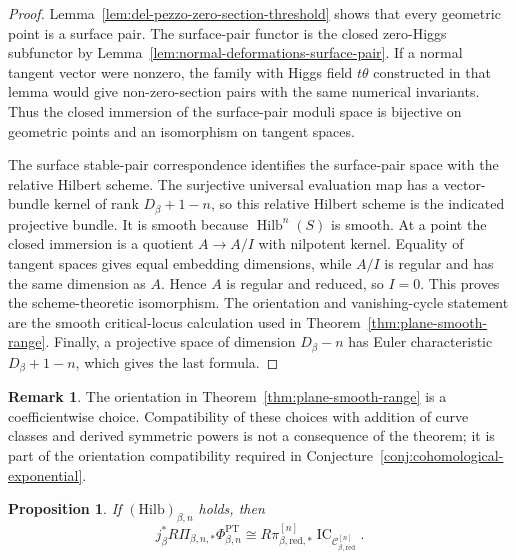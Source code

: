 \documentclass[11pt,reqno]{amsart}
\newtheorem{proposition}[theorem]{Proposition}
\theoremstyle{definition}
\newtheorem{remark}[theorem]{Remark}
\newcommand{\IC}{\operatorname{IC}}
\newcommand{\Hilb}{\operatorname{Hilb}}
\newcommand{\PT}{\operatorname{PT}}
\newcommand{\red}{\mathrm{red}}
\begin{document}
\begin{proof}
Lemma~\ref{lem:del-pezzo-zero-section-threshold} shows that every geometric
point is a surface pair.  The surface-pair functor is the closed zero-Higgs
subfunctor by Lemma~\ref{lem:normal-deformations-surface-pair}.  If a
normal tangent vector were nonzero, the family with Higgs field
\(t\theta\) constructed in that lemma would give non-zero-section pairs
with the same numerical invariants.  Thus the closed immersion of the
surface-pair moduli space is bijective on geometric points and an
isomorphism on tangent spaces.

The surface stable-pair correspondence
\cite[Proposition~1]{CKK} identifies the surface-pair space with the
relative Hilbert scheme.  The surjective universal evaluation map has a
vector-bundle kernel of rank \(D_\beta+1-n\), so this relative Hilbert
scheme is the indicated projective bundle.  It is smooth because \(\Hilb^n(S)\) is
smooth.  At a point the closed immersion is a
quotient \(A\to A/I\) with nilpotent kernel.  Equality of tangent spaces
gives equal embedding dimensions, while \(A/I\) is regular and has the
same dimension as \(A\).  Hence \(A\) is regular and reduced, so \(I=0\).
This proves the scheme-theoretic isomorphism.  The orientation and
vanishing-cycle statement are the smooth critical-locus calculation used
in Theorem~\ref{thm:plane-smooth-range}.  Finally, a projective space of
dimension \(D_\beta-n\) has Euler characteristic \(D_\beta+1-n\), which
gives the last formula.
\end{proof}

\begin{remark}
The orientation in Theorem~\ref{thm:plane-smooth-range} is a
coefficientwise choice.  Compatibility of these choices with addition of
curve classes and derived symmetric powers is not a consequence of the
theorem; it is part of the orientation compatibility required in
Conjecture~\ref{conj:cohomological-exponential}.
\end{remark}

\begin{proposition}\label{prop:open-base-change}
If $(\mathrm{Hilb})_{\beta,n}$ holds, then
\[
  j_\beta^*R\Pi_{\beta,n,*}\Phi_{\beta,n}^{\PT}
  \cong
  R\pi_{\beta,\red,*}^{[n]}
  \IC_{\mathcal C_{\beta,\red}^{[n]}}.
\]
\end{proposition}
\end{document}

